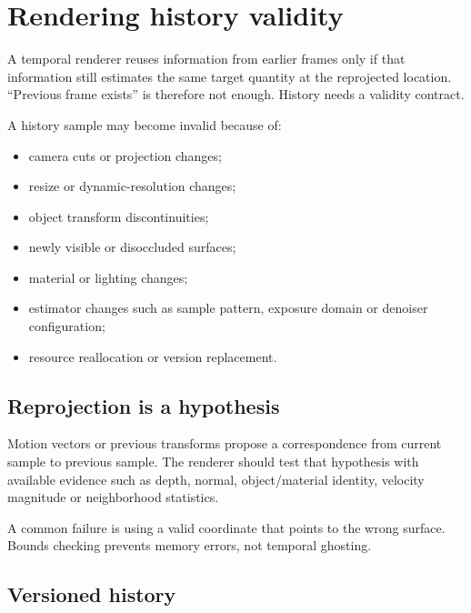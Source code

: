 \hypertarget{appendix-2e7e9fd28a2c}{}\label{referencestart:appendix-2e7e9fd28a2c}
\section{Rendering history validity}\label{appendix-2e7e9fd28a2c-rendering-history-validity}

A temporal renderer reuses information from earlier frames only if that information still estimates the same target quantity at the reprojected location. ``Previous frame exists'' is therefore not enough. History needs a validity contract.

A history sample may become invalid because of:

\begin{itemize}
\tightlist
\item
  camera cuts or projection changes;
\item
  resize or dynamic-resolution changes;
\item
  object transform discontinuities;
\item
  newly visible or disoccluded surfaces;
\item
  material or lighting changes;
\item
  estimator changes such as sample pattern, exposure domain or denoiser configuration;
\item
  resource reallocation or version replacement.
\end{itemize}

\subsection{Reprojection is a hypothesis}\label{appendix-2e7e9fd28a2c-reprojection-is-a-hypothesis}

Motion vectors or previous transforms propose a correspondence from current sample to previous sample. The renderer should test that hypothesis with available evidence such as depth, normal, object/material identity, velocity magnitude or neighborhood statistics.

A common failure is using a valid coordinate that points to the wrong surface. Bounds checking prevents memory errors, not temporal ghosting.

\subsection{Versioned history}\label{appendix-2e7e9fd28a2c-versioned-history}

